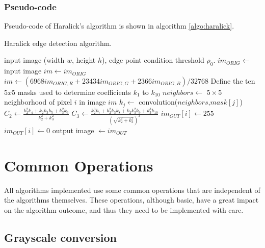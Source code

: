 \documentclass{ipol}
\numberwithin{equation}{section}
\numberwithin{table}{section}
\numberwithin{figure}{section}
\begin{document}
\subsubsection{Pseudo-code}

Pseudo-code of Haralick's algorithm is shown in algorithm \ref{algo:haralick}.

\begin{algorithm}[t]
\caption{Haralick edge detection algorithm.}
\label{algo:haralick}
\begin{algorithmic}[1]
\REQUIRE input image (width $w$, height $h$), edge point condition threshold $\rho_0$.
\STATE $im_{ORIG} \leftarrow$ input image
	\STATE $im \leftarrow im_{ORIG}$
\ELSE 
	\STATE $im \leftarrow (6968im_{ORIG,R}+23434im_{ORIG,G}+2366im_{ORIG,B})/32768$ 
\ENDIF
\STATE Define the ten $5x5$ masks used to determine coefficients $k_1$ to $k_{10}$ 
	\STATE $neighbors \leftarrow$ $5\times5$ neighborhood of pixel $i$ in image $im$
		\STATE $k_j \leftarrow$ convolution($neighbors$,$mask[j]$)
	\ENDFOR
	\STATE $C_2 \leftarrow \frac{k_2^2k_4 + k_2k_3k_5 + k_3^2k_6}{k_2^2 + k_3^2}$
	\STATE $C_3 \leftarrow \frac{k_2^3k_7 + k_2^2k_3k_8 + k_2k_3^2k_9 + k_3^3k_{10}}{(\sqrt{k_2^2 + k_3^2})^3}$
		\STATE $im_{OUT}[i] \leftarrow 255$
	\ELSE
		\STATE $im_{OUT}[i] \leftarrow 0$
	\ENDIF
\ENDFOR
\RETURN output image $\leftarrow im_{OUT}$
\end{algorithmic}
\end{algorithm}


\section{Common Operations}
\label{sec:appendix1}

All algorithms implemented use some common operations that are independent of the algorithms themselves. 
These operations, although basic, have a great impact on the algorithm outcome, and thus they need to be 
implemented with care.


\subsection{Grayscale conversion}
\end{document}
